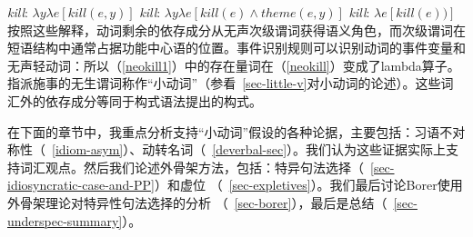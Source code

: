 \eal
\label{neokill}\settowidth{}
\ex \emph{kill}: $\lambda y\lambda e[kill(e, y)]$                         
\ex \emph{kill}: $\lambda y\lambda e[kill(e) \wedge theme(e, y)]$ 
\ex \emph{kill}: $\lambda e[kill(e))]$                                  
\zl
按照这些解释，动词剩余的依存成分从无声次级谓词获得语义角色，而次级谓词在短语结构中通常占据功能中心语的位置。事件识别规则可以识别动词的事件变量和无声轻动词\citep[]{Kratzer96a}：所以（\ref{neokill1}）中的存在量词在（\ref{neokill}）变成了lambda算子。指派施事的无生谓词称作“小动词”（参看~\ref{sec-little-v}对小动词的论述）。这些词汇外的依存成分等同于构式语法提出的构式。

    在下面的章节中，我重点分析支持“小动词”假设的各种论据，主要包括：习语不对称性（~\ref{idiom-asym}）、动转名词（~\ref{deverbal-sec}）。我们认为这些证据实际上支持词汇观点。然后我们论述外骨架方法，包括：特异句法选择（~\ref{sec-idiosyncratic-case-and-PP}）和虚位 （~\ref{sec-expletives}）。我们最后讨论Borer使用外骨架理论对特异性句法选择的分析 （~\ref{sec-borer}），最后是总结（~\ref{sec-underspec-summary}）。

